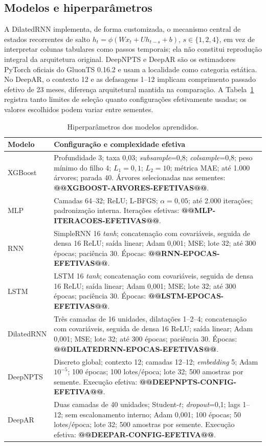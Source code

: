 \documentclass[10pt,conference,a4paper]{IEEEtran}
\begin{document}
\subsection{Modelos e hiperparâmetros}

A DilatedRNN implementa, de forma customizada, o mecanismo central de estados
recorrentes de salto $h_t=\phi(Wx_t+Uh_{t-s}+b)$,
$s\in\{1,2,4\}$, em vez de interpretar colunas tabulares como passos
temporais; ela não constitui reprodução integral da arquitetura original.
DeepNPTS e DeepAR são os estimadores PyTorch oficiais do GluonTS 0.16.2 e usam
a localidade como categoria estática. No DeepAR, o contexto 12 e as defasagens
1--12 implicam comprimento passado efetivo de 23 meses, diferença arquitetural
mantida na comparação. A
Tabela~\ref{tab:hiper} registra tanto limites de seleção quanto configurações
efetivamente usadas; os valores escolhidos podem variar entre sementes.

\begin{table}[!t]
\centering
\caption{Hiperparâmetros dos modelos aprendidos.}
\label{tab:hiper}
\scriptsize
\setlength{\tabcolsep}{3.5pt}
\renewcommand{\arraystretch}{1.05}
\begin{tabular}{>{\raggedright\arraybackslash}p{1.75cm}>{\raggedright\arraybackslash}p{15.25cm}}
\toprule
\textbf{Modelo} & \textbf{Configuração e complexidade efetiva} \\
\midrule
XGBoost & Profundidade 3; taxa 0,03; \textit{subsample}=0,8;
\textit{colsample}=0,8; peso mínimo do filho 4; $L_1=0,1$; $L_2=10$;
métrica MAE; até 1.000 árvores; parada 40.
Árvores selecionadas nas sementes: \textbf{@@XGBOOST-ARVORES-EFETIVAS@@}. \\
MLP & Camadas 64--32; ReLU; L-BFGS; $\alpha=0,05$; até 2.000 iterações;
padronização interna. Iterações efetivas: \textbf{@@MLP-ITERACOES-EFETIVAS@@}. \\
RNN & SimpleRNN 16 \textit{tanh}; concatenação com covariáveis, seguida de
densa 16 ReLU; saída linear; Adam 0,001; MSE;
lote 32; até 300 épocas; paciência 30. Épocas: \textbf{@@RNN-EPOCAS-EFETIVAS@@}. \\
LSTM & LSTM 16 \textit{tanh}; concatenação com covariáveis, seguida de densa
16 ReLU; saída linear; Adam 0,001; MSE;
lote 32; até 300 épocas; paciência 30. Épocas: \textbf{@@LSTM-EPOCAS-EFETIVAS@@}. \\
DilatedRNN & Três camadas de 16 unidades, dilatações 1--2--4; concatenação com
covariáveis, seguida de densa 16 ReLU; saída linear; Adam 0,001; MSE; lote 32;
até 300 épocas; paciência 30. Épocas:
\textbf{@@DILATEDRNN-EPOCAS-EFETIVAS@@}. \\
DeepNPTS & Discreto global; contexto 12; camadas 12--12; \textit{embedding} 5;
Adam $10^{-5}$; 100 épocas; 100 lotes/época; lote 32; 500 amostras por semente.
Execução efetiva: \textbf{@@DEEPNPTS-CONFIG-EFETIVA@@}. \\
DeepAR & Duas camadas de 40 unidades; Student-$t$; \textit{dropout}=0,1; lags
1--12; sem escalonamento interno; Adam 0,001; 100 épocas; 50 lotes/época;
lote 32; 500 amostras por semente. Execução efetiva:
\textbf{@@DEEPAR-CONFIG-EFETIVA@@}. \\
\bottomrule
\end{tabular}
\end{table}
\end{document}

